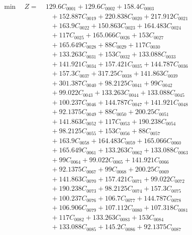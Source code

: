 \documentclass[a4paper,10pt]{article}
\begin{document}
\allowdisplaybreaks
{\small
\begin{align}
\min \quad Z = &\; 129.6C_{0001} + 129.6C_{0002} + 158.4C_{0003} \\[0.5ex]
&\quad  + 152.887C_{0019} + 220.838C_{0020} + 217.912C_{0021} \\[0.5ex]
&\quad  + 163.9C_{0022} + 150.863C_{0023} + 164.483C_{0024} \\[0.5ex]
&\quad  + 117C_{0025} + 165.066C_{0026} + 153C_{0027} \\[0.5ex]
&\quad  + 165.649C_{0028} + 88C_{0029} + 117C_{0030} \\[0.5ex]
&\quad  + 133.263C_{0031} + 153C_{0032} + 133.088C_{0033} \\[0.5ex]
&\quad  + 141.921C_{0034} + 157.421C_{0035} + 144.787C_{0036} \\[0.5ex]
&\quad  + 157.3C_{0037} + 317.25C_{0038} + 141.863C_{0039} \\[0.5ex]
&\quad  + 301.387C_{0040} + 98.2125C_{0041} + 99C_{0042} \\[0.5ex]
&\quad  + 99.022C_{0043} + 133.263C_{0044} + 133.088C_{0045} \\[0.5ex]
&\quad  + 100.237C_{0046} + 144.787C_{0047} + 141.921C_{0048} \\[0.5ex]
&\quad  + 92.1375C_{0049} + 88C_{0050} + 200.25C_{0051} \\[0.5ex]
&\quad  + 141.863C_{0052} + 117C_{0053} + 190.238C_{0054} \\[0.5ex]
&\quad  + 98.2125C_{0055} + 153C_{0056} + 88C_{0057} \\[0.5ex]
&\quad  + 163.9C_{0058} + 164.483C_{0059} + 165.066C_{0060} \\[0.5ex]
&\quad  + 165.649C_{0061} + 133.263C_{0062} + 133.088C_{0063} \\[0.5ex]
&\quad  + 99C_{0064} + 99.022C_{0065} + 141.921C_{0066} \\[0.5ex]
&\quad  + 92.1375C_{0067} + 99C_{0068} + 200.25C_{0069} \\[0.5ex]
&\quad  + 141.863C_{0070} + 157.421C_{0071} + 99.022C_{0072} \\[0.5ex]
&\quad  + 190.238C_{0073} + 98.2125C_{0074} + 157.3C_{0075} \\[0.5ex]
&\quad  + 100.237C_{0076} + 106.7C_{0077} + 144.787C_{0078} \\[0.5ex]
&\quad  + 106.906C_{0079} + 107.112C_{0080} + 107.318C_{0081} \\[0.5ex]
&\quad  + 117C_{0082} + 133.263C_{0083} + 153C_{0084} \\[0.5ex]
&\quad  + 133.088C_{0085} + 145.2C_{0086} + 92.1375C_{0087} \\[0.5ex]

\end{align}}
\end{document}
